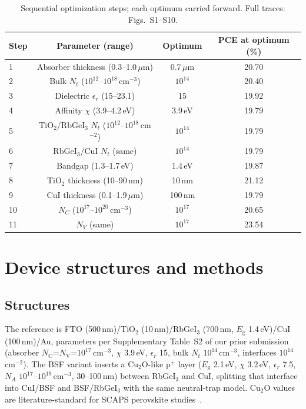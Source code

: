 \documentclass[review]{elsarticle}
\begin{document}
\begin{table}[htbp]
\centering
{\footnotesize\setlength{\tabcolsep}{3pt}
\begin{tabularx}{\textwidth}{Xccc}
\hline
Step & Parameter (range) & Optimum & PCE at optimum (\%)\\
\hline
1 & Absorber thickness (0.3--1.0\,$\mu$m) & 0.7\,$\mu$m & 20.70\\
2 & Bulk $N_{t}$ ($10^{12}$--$10^{18}$\,cm$^{-3}$) & $10^{14}$ & 20.40\\
3 & Dielectric $\epsilon_{r}$ (15--23.1) & 15 & 19.92\\
4 & Affinity $\chi$ (3.9--4.2\,eV) & 3.9\,eV & 19.79\\
5 & TiO$_{2}$/RbGeI$_{3}$ $N_{t}$ ($10^{12}$--$10^{18}$\,cm$^{-2}$) & $10^{14}$ & 19.79\\
6 & RbGeI$_{3}$/CuI $N_{t}$ (same) & $10^{14}$ & 19.79\\
7 & Bandgap (1.3--1.7\,eV) & 1.4\,eV & 19.87\\
8 & TiO$_{2}$ thickness (10--90\,nm) & 10\,nm & 21.12\\
9 & CuI thickness (0.1--1.9\,$\mu$m) & 100\,nm & 19.79\\
10 & $N_{C}$ ($10^{17}$--$10^{20}$\,cm$^{-3}$) & $10^{17}$ & 20.65\\
11 & $N_{V}$ (same) & $10^{17}$ & 23.54\\
\hline
\end{tabularx}}
\caption{Sequential optimization steps; each optimum carried forward. Full traces: Figs.~S1--S10.}
\end{table}

\section{Device structures and methods}
\subsection{Structures}
The reference is FTO (500\,nm)/TiO$_{2}$ (10\,nm)/RbGeI$_{3}$ (700\,nm, $E_{\mathrm{g}}$ 1.4\,eV)/CuI (100\,nm)/Au, parameters per Supplementary Table~S2 of our prior submission (absorber $N_{\mathrm{C}}$=$N_{\mathrm{V}}$=$10^{17}$\,cm$^{-3}$, $\chi$ 3.9\,eV, $\epsilon_{r}$ 15, bulk $N_{t}$ $10^{14}$\,cm$^{-3}$, interfaces $10^{14}$\,cm$^{-2}$). The BSF variant inserts a Cu$_{2}$O-like p$^{+}$ layer ($E_{\mathrm{g}}$ 2.1\,eV, $\chi$ 3.2\,eV, $\epsilon_{r}$ 7.5, $N_{A}$ $10^{17}$--$10^{19}$\,cm$^{-3}$, 30--100\,nm) between RbGeI$_{3}$ and CuI, splitting that interface into CuI/BSF and BSF/RbGeI$_{3}$ with the same neutral-trap model. Cu$_{2}$O values are literature-standard for SCAPS perovskite studies~\cite{rMA}.
\end{document}
